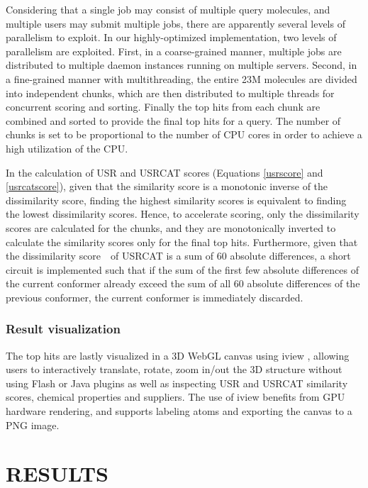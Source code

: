 \documentclass[a4,center,fleqn]{NAR}
\begin{document}
Considering that a single job may consist of multiple query molecules, and multiple users may submit multiple jobs, there are apparently several levels of parallelism to exploit. In our highly-optimized implementation, two levels of parallelism are exploited. First, in a coarse-grained manner, multiple jobs are distributed to multiple daemon instances running on multiple servers. Second, in a fine-grained manner with multithreading, the entire 23M molecules are divided into independent chunks, which are then distributed to multiple threads for concurrent scoring and sorting. Finally the top hits from each chunk are combined and sorted to provide the final top hits for a query. The number of chunks is set to be proportional to the number of CPU cores in order to achieve a high utilization of the CPU.

In the calculation of USR and USRCAT scores (Equations \eqref{usrscore} and \eqref{usrcatscore}), given that the similarity score is a monotonic inverse of the dissimilarity score, finding the highest similarity scores is equivalent to finding the lowest dissimilarity scores. Hence, to accelerate scoring, only the dissimilarity scores are calculated for the chunks, and they are monotonically inverted to calculate the similarity scores only for the final top hits. Furthermore, given that the dissimilarity score　of USRCAT is a sum of 60 absolute differences, a short circuit is implemented such that if the sum of the first few absolute differences of the current conformer already exceed the sum of all 60 absolute differences of the previous conformer, the current conformer is immediately discarded.

\subsubsection{Result visualization}

The top hits are lastly visualized in a 3D WebGL canvas using iview \cite{1366}, allowing users to interactively translate, rotate, zoom in/out the 3D structure without using Flash or Java plugins as well as inspecting USR and USRCAT similarity scores, chemical properties and suppliers. The use of iview \cite{1366} benefits from GPU hardware rendering, and supports labeling atoms and exporting the canvas to a PNG image.

\section{RESULTS}
\end{document}
